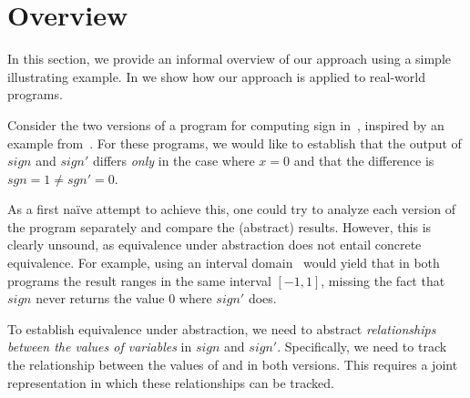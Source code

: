 \section{Overview}

In this section, we provide an informal overview of our approach using a simple illustrating example. In  we show how our approach is applied to real-world programs.

Consider the two versions of a program for computing sign in~, inspired by an example from~\cite{MauborgneRival07}. For these programs, we would like to establish that the output of $sign$ and $sign'$ differs \emph{only} in the case where $x=0$ and that the difference is $sgn = 1 \neq sgn' = 0$.


As a first na\"{i}ve attempt to achieve this, one could try to analyze each version of the program separately and compare the (abstract) results. However, this is clearly unsound, as equivalence under abstraction does not entail concrete equivalence. For example, using an interval domain~\cite{CousotHalbwachs78} would yield that in both programs the result ranges in the same interval $[-1,1]$, missing the fact that $sign$ never returns the value $0$ where $sign'$ does.


To establish equivalence under abstraction, we need to abstract \emph{relationships between the values of variables} in $sign$ and $sign'$. Specifically, we need to track the relationship between the values of  and  in both versions. This requires a joint representation in which these relationships can be tracked.

